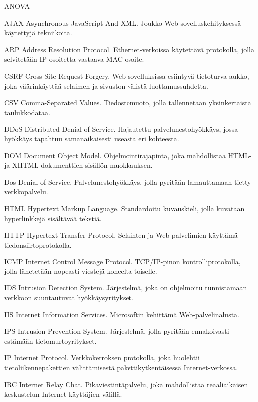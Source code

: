 
\termlist

\begin{abbrlist}{ANOVA}
\item[AJAX]	Asynchronous JavaScript And XML. Joukko Web-sovelluskehityksessä käytettyjä tekniikoita.
\item[ARP]	Address Resolution Protocol. Ethernet-verkoissa käytettävä protokolla, jolla selvitetään IP-osoitetta vastaava MAC-osoite.
\item[CSRF]	Cross Site Request Forgery. Web-sovelluksissa esiintyvä tietoturva-aukko, joka väärinkäyttää selaimen ja sivuston välistä luottamussuhdetta.
\item[CSV]	Comma-Separated Values. Tiedostomuoto, jolla tallennetaan yksinkertaista taulukkodataa.
\item[DDoS]	Distributed Denial of Service. Hajautettu palvelunestohyökkäys, jossa hyökkäys tapahtuu samanaikaisesti useasta eri kohteesta.
\item[DOM]	Document Object Model. Ohjelmointirajapinta, joka mahdollistaa HTML- ja XHTML-dokumenttien sisällön muokkauksen.
\item[Dos]	Denial of Service. Palvelunestohyökkäys, jolla pyritään lamauttamaan tietty verkkopalvelu.
\item[HTML]	Hypertext Markup Language. Standardoitu kuvauskieli, jolla kuvataan hyperlinkkejä sisältävää tekstiä.
\item[HTTP]     Hypertext Transfer Protocol. Selainten ja Web-palvelimien käyttämä tiedonsiirtoprotokolla.
\item[ICMP]	Internet Control Message Protocol. TCP/IP-pinon kontrolliprotokolla, jolla lähetetään nopeasti viestejä koneelta toiselle.
\item[IDS]	Intrusion Detection System. Järjestelmä, joka on ohjelmoitu tunnistamaan verkkoon suuntautuvat hyökkäysyritykset.
\item[IIS]      Internet Information Services. Microsoftin kehittämä Web-palvelinalusta.
\item[IPS]	Intrusion Prevention System. Järjestelmä, jolla pyritään ennakoivasti estämään tietomurtoyritykset.
\item[IP]	Internet Protocol. Verkkokerroksen protokolla, joka huolehtii tietoliikennepakettien välittämisestä pakettikytkentäisessä Internet-verkossa.
\item[IRC]	Internet Relay Chat. Pikaviestintäpalvelu, joka mahdollistaa reaaliaikaisen keskustelun Internet-käyttäjien välillä.

\end{abbrlist}
